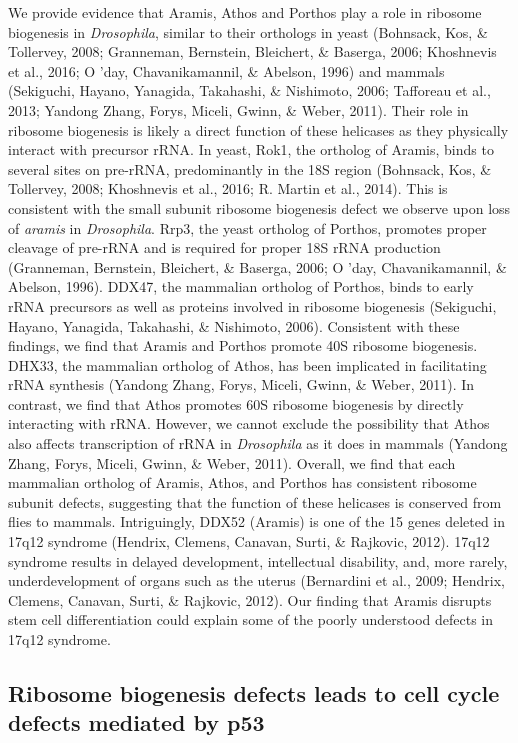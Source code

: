 \documentclass[12pt,oneside]{reedthesis}
\begin{document}
We provide evidence that Aramis, Athos and Porthos play a role in ribosome biogenesis in \emph{Drosophila}, similar to their orthologs in yeast (Bohnsack, Kos, \& Tollervey, 2008; Granneman, Bernstein, Bleichert, \& Baserga, 2006; Khoshnevis et al., 2016; O 'day, Chavanikamannil, \& Abelson, 1996) and mammals (Sekiguchi, Hayano, Yanagida, Takahashi, \& Nishimoto, 2006; Tafforeau et al., 2013; Yandong Zhang, Forys, Miceli, Gwinn, \& Weber, 2011). Their role in ribosome biogenesis is likely a direct function of these helicases as they physically interact with precursor rRNA. In yeast, Rok1, the ortholog of Aramis, binds to several sites on pre-rRNA, predominantly in the 18S region (Bohnsack, Kos, \& Tollervey, 2008; Khoshnevis et al., 2016; R. Martin et al., 2014). This is consistent with the small subunit ribosome biogenesis defect we observe upon loss of \emph{aramis} in \emph{Drosophila}. Rrp3, the yeast ortholog of Porthos, promotes proper cleavage of pre-rRNA and is required for proper 18S rRNA production (Granneman, Bernstein, Bleichert, \& Baserga, 2006; O 'day, Chavanikamannil, \& Abelson, 1996). DDX47, the mammalian ortholog of Porthos, binds to early rRNA precursors as well as proteins involved in ribosome biogenesis (Sekiguchi, Hayano, Yanagida, Takahashi, \& Nishimoto, 2006). Consistent with these findings, we find that Aramis and Porthos promote 40S ribosome biogenesis. DHX33, the mammalian ortholog of Athos, has been implicated in facilitating rRNA synthesis (Yandong Zhang, Forys, Miceli, Gwinn, \& Weber, 2011). In contrast, we find that Athos promotes 60S ribosome biogenesis by directly interacting with rRNA. However, we cannot exclude the possibility that Athos also affects transcription of rRNA in \emph{Drosophila} as it does in mammals (Yandong Zhang, Forys, Miceli, Gwinn, \& Weber, 2011). Overall, we find that each mammalian ortholog of Aramis, Athos, and Porthos has consistent ribosome subunit defects, suggesting that the function of these helicases is conserved from flies to mammals. Intriguingly, DDX52 (Aramis) is one of the 15 genes deleted in 17q12 syndrome (Hendrix, Clemens, Canavan, Surti, \& Rajkovic, 2012). 17q12 syndrome results in delayed development, intellectual disability, and, more rarely, underdevelopment of organs such as the uterus (Bernardini et al., 2009; Hendrix, Clemens, Canavan, Surti, \& Rajkovic, 2012). Our finding that Aramis disrupts stem cell differentiation could explain some of the poorly understood defects in 17q12 syndrome.

\hypertarget{ribosome-biogenesis-defects-leads-to-cell-cycle-defects-mediated-by-p53}{%
\subsection{Ribosome biogenesis defects leads to cell cycle defects mediated by p53}\label{ribosome-biogenesis-defects-leads-to-cell-cycle-defects-mediated-by-p53}}
\end{document}
